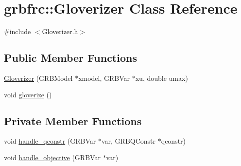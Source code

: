 \hypertarget{classgrbfrc_1_1Gloverizer}{}\section{grbfrc\+:\+:Gloverizer Class Reference}
\label{classgrbfrc_1_1Gloverizer}


{\ttfamily \#include $<$Gloverizer.\+h$>$}

\subsection*{Public Member Functions}
\begin{DoxyCompactItemize}
\item 
\hyperlink{classgrbfrc_1_1Gloverizer_a7ded4f85d1f03554adf75cb3d3edb7c0}{Gloverizer} (G\+R\+B\+Model $\ast$xmodel, G\+R\+B\+Var $\ast$xu, double umax)
\item 
void \hyperlink{classgrbfrc_1_1Gloverizer_aa9c5f76ffc566944c56d6a45beee16e7}{gloverize} ()
\end{DoxyCompactItemize}
\subsection*{Private Member Functions}
\begin{DoxyCompactItemize}
\item 
void \hyperlink{classgrbfrc_1_1Gloverizer_a94a1a62395d6ec2d8ba418a812cfbed7}{handle\+\_\+qconstr} (G\+R\+B\+Var $\ast$var, G\+R\+B\+Q\+Constr $\ast$qconstr)
\item 
void \hyperlink{classgrbfrc_1_1Gloverizer_ac5074a3f184676514d56f1fc2b7a69f4}{handle\+\_\+objective} (G\+R\+B\+Var $\ast$var)
\end{DoxyCompactItemize}
